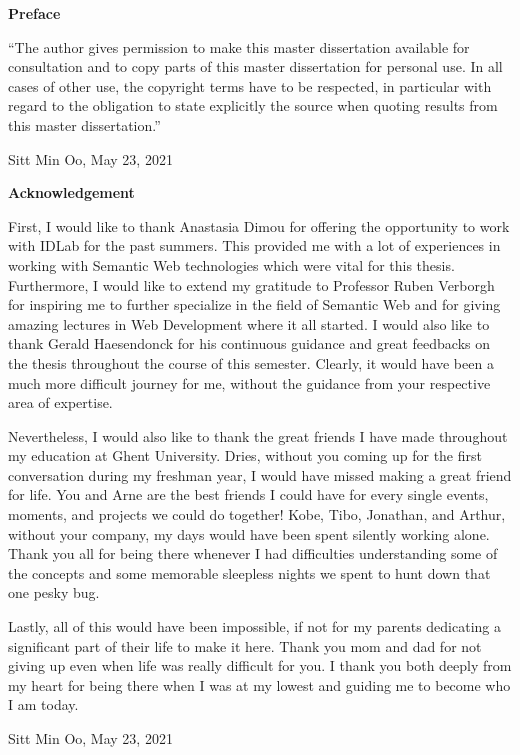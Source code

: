 
\newpage
{}
{}
\noindent \textbf{\huge Preface}

\vspace{1.5cm}

\noindent
``The author gives permission to make this master dissertation available for consultation and to copy parts
of this master dissertation for personal use. In all cases of other use, the copyright terms have to be respected,
in particular with regard to the obligation to state explicitly the source when quoting results from this master
dissertation.''

\vspace{1cm}

\noindent Sitt Min Oo, May 23, 2021 


\newpage
{}
{}
\noindent \textbf{\huge Acknowledgement}

\vspace{1.5cm}
First, I would like to thank Anastasia Dimou for offering the opportunity to 
work with IDLab for the past summers. This provided me with a lot of experiences 
in working with Semantic Web technologies which were vital for this 
thesis. Furthermore, I would like to extend my gratitude to Professor Ruben Verborgh 
for inspiring me to further specialize in the field of Semantic Web and for giving amazing 
lectures in Web Development where it all started. I would also like to thank Gerald Haesendonck for 
his continuous guidance and great feedbacks on the thesis throughout the course of this semester. 
Clearly, it would have been a much more difficult journey for me, without the guidance from your 
respective area of expertise.

Nevertheless, I would also like to thank the great friends I have made throughout my education 
at Ghent University. Dries, without you coming up for the first conversation during my freshman year, I would 
have missed making a great friend for life. You and Arne are the best friends I could have for every single 
events, moments, and projects we could do together! Kobe, Tibo, Jonathan, and Arthur, without your company,  
my days would have been spent silently working alone. 
Thank you all for being there whenever I had difficulties understanding some 
of the concepts and some memorable sleepless nights we spent to hunt down that one pesky bug.  

Lastly, all of this would have been impossible, if not for my parents dedicating a significant part of 
their life to make it here. Thank you mom and dad for not giving up even when life was really difficult 
for you. 
I thank you both deeply from my heart for being there when I was at my lowest and guiding me to become 
who I am today. 

\vspace{1cm}
\noindent Sitt Min Oo, May 23, 2021 
